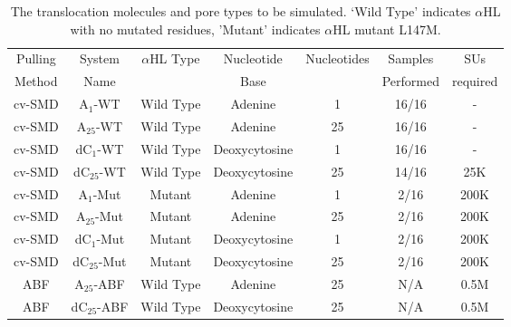 \documentclass[a4paper,10pt]{article}
\newcommand{\dctfnsp}{dC$_{25}$}
\newcommand{\atfnsp}{A$_{25}$}
\newcommand{\dconsp}{dC$_{1}$}
\newcommand{\aonsp}{A$_{1}$}
\newcommand{\ahl}{$\alpha$HL }
\begin{document}
\begin{table}[!h]
\begin{center}
  \caption{The translocation molecules and pore types
to be simulated. `Wild Type' indicates \ahl with no mutated residues,
'Mutant' indicates \ahl mutant L147M.\newline}
\label{table:systems}
\begin{tabular}{| c | c | c | c | c | c | c |}
\hline
Pulling & System & \ahl Type & Nucleotide & Nucleotides & Samples &
SUs \\
Method & Name &  & Base &  & Performed & required \\
\hline
cv-SMD & \aonsp-WT & Wild Type & Adenine & 1 & 16/16 & - \\
cv-SMD & \atfnsp-WT & Wild Type & Adenine & 25 & 16/16 & - \\
cv-SMD & \dconsp-WT & Wild Type & Deoxycytosine & 1 & 16/16 & - \\
cv-SMD & \dctfnsp-WT & Wild Type & Deoxycytosine & 25 & 14/16 & 25K\\
cv-SMD & \aonsp-Mut & Mutant & Adenine & 1 & 2/16 & 200K \\
cv-SMD & \atfnsp-Mut & Mutant & Adenine & 25 & 2/16 & 200K \\
cv-SMD & \dconsp-Mut & Mutant & Deoxycytosine & 1 & 2/16 & 200K \\
cv-SMD & \dctfnsp-Mut & Mutant & Deoxycytosine & 25 & 2/16 & 200K \\
ABF & \atfnsp-ABF & Wild Type & Adenine & 25 & N/A & 0.5M \\
ABF & \dctfnsp-ABF & Wild Type & Deoxycytosine & 25 & N/A & 0.5M \\
\hline
\end{tabular}
\end{center}
\end{table}
\end{document}

